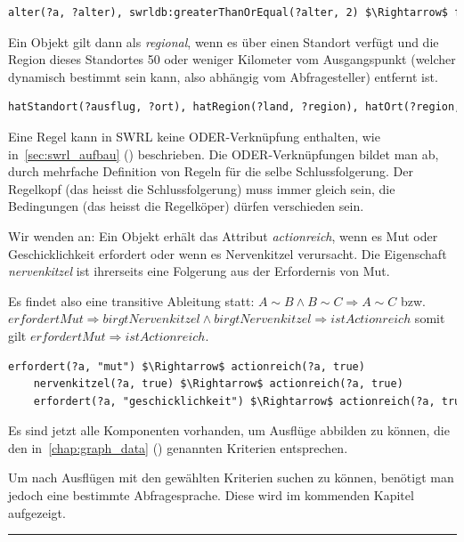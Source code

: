 \begin{lstlisting}[caption={Beispiel der SWRL-Regel für die Eigenschaft \textit{familienfreundlich}},captionpos=b,language=XML]
    alter(?a, ?alter), swrldb:greaterThanOrEqual(?alter, 2) $\Rightarrow$ familienfreundlich(?a, true)
\end{lstlisting}

Ein Objekt gilt dann als \textit{regional}, wenn es über einen Standort verfügt und die Region dieses Standortes 50 oder weniger Kilometer vom Ausgangspunkt (welcher dynamisch bestimmt sein kann, also abhängig vom Abfragesteller) entfernt ist.

\begin{lstlisting}[caption={Beispiel der SWRL-Regel für die Eigenschaft \textit{regional}},captionpos=b,language=xml]
    hatStandort(?ausflug, ?ort), hatRegion(?land, ?region), hatOrt(?region, ?ort), distanzZuAusgangspunkt(?region, ?distanz), swrldb:lessThanOrEqual(?distanz, 50) $\Rightarrow$ regional(?ausflug, true)
\end{lstlisting}

Eine Regel kann in SWRL keine ODER-Verknüpfung enthalten, wie in~\autoref{sec:swrl_aufbau} () beschrieben. Die ODER-Verknüpfungen bildet man ab, durch mehrfache Definition von Regeln für die selbe Schlussfolgerung. Der Regelkopf (das heisst die Schlussfolgerung) muss immer gleich sein, die Bedingungen (das heisst die Regelköper) dürfen verschieden sein.

Wir wenden an: Ein Objekt erhält das Attribut \textit{actionreich}, wenn es Mut oder Geschicklichkeit erfordert oder wenn es Nervenkitzel verursacht. Die Eigenschaft \textit{nervenkitzel} ist ihrerseits eine Folgerung aus der Erfordernis von Mut.

Es findet also eine transitive Ableitung statt: $A \sim B \wedge B \sim C \Rightarrow A \sim C$ bzw. $erfordertMut \Rightarrow birgtNervenkitzel \wedge birgtNervenkitzel \Rightarrow istActionreich$ somit gilt $erfordertMut \Rightarrow istActionreich$.

\begin{lstlisting}[caption={Beispiel der SWRL-Regel für die Eigenschaft \textit{actionreich}},captionpos=b,language=XML]
    erfordert(?a, "mut") $\Rightarrow$ actionreich(?a, true)
    nervenkitzel(?a, true) $\Rightarrow$ actionreich(?a, true)
    erfordert(?a, "geschicklichkeit") $\Rightarrow$ actionreich(?a, true)
\end{lstlisting}

Es sind jetzt alle Komponenten vorhanden, um Ausflüge abbilden zu können, die den in~\autoref{chap:graph_data} () genannten Kriterien entsprechen.

Um nach Ausflügen mit den gewählten Kriterien suchen zu können, benötigt man jedoch eine bestimmte Abfragesprache. Diese wird im kommenden Kapitel aufgezeigt.

\noindent\rule[1ex]{\textwidth}{1pt}
